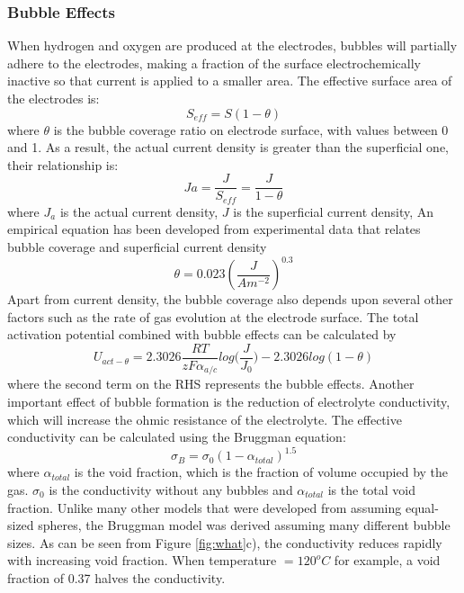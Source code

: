 \subsubsection{Bubble Effects}
When hydrogen and oxygen are produced at the electrodes, bubbles will partially adhere to the electrodes, making a fraction of the surface electrochemically inactive so that current is applied to a smaller area. The effective surface area of the electrodes is:\cite{bubble2}
\begin{equation} 
S_{eff} = S(1-\theta)
\end{equation}
where $\theta$ is the bubble coverage ratio on electrode surface, with values between 0 and 1. As a result, the actual current density is greater than the superficial one, their relationship is:\cite{bubble2}
\begin{equation} 
Ja = \frac{J}{S_{eff}} = \frac{J}{1-\theta}
\end{equation} 
where $J_a$ is the actual current density, $J$ is the superficial current density, An empirical equation has been developed from experimental data that relates bubble coverage and superficial current density \cite{bubble2} 
\begin{equation}
\theta = 0.023(\frac{J}{Am^{-2}})^{0.3}
\end{equation} 
Apart from current density, the bubble coverage also depends upon several other factors such as the rate of gas evolution at the electrode surface.\cite{bubble2} The total activation potential combined with bubble effects can be calculated by\cite{activation4} 
\begin{equation} 
U_{act-\theta} = 2.3026\frac{RT}{zF\alpha_{a/c}}{log(\frac{J}{J_0}}) - 2.3026log(1-\theta) 
\end{equation} 
where the second term on the RHS represents the bubble effects. Another important effect of bubble formation is  the reduction of electrolyte conductivity, which will increase the ohmic resistance of the electrolyte. The effective conductivity  can be calculated using the Bruggman equation:\cite{void} 
\begin{equation}
\sigma_B = \sigma_0(1- \alpha_{total})^{1.5}
\end{equation}
where $\alpha_{total}$ is the void fraction, which is the fraction of volume occupied by the gas. $\sigma_0$ is the conductivity without any bubbles and $\alpha_{total}$ is the total void fraction. Unlike many other models  that were developed from assuming equal-sized spheres, the Bruggman model was derived assuming many different bubble sizes.  As can be seen from Figure \ref{fig:what}c), the conductivity reduces rapidly with increasing void fraction. When temperature $= 120^oC$ for example, a void fraction of 0.37 halves the conductivity. %
